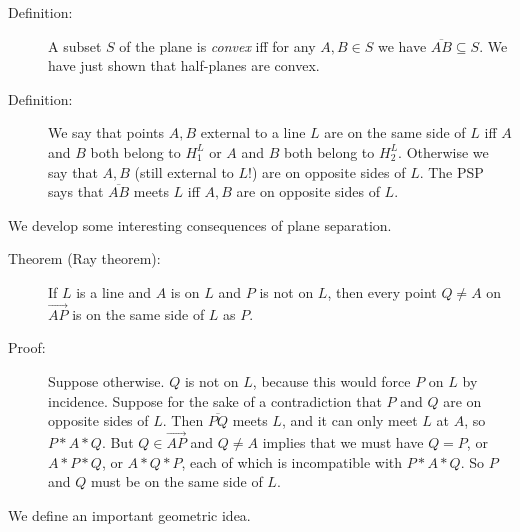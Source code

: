 \documentclass[12pt]{article}
\begin{document}
\begin{description}

\item[Definition:]  A subset $S$ of the plane is {\em convex\/} iff for any $A,B \in S$ we have $\overline{AB} \subseteq S$.  We have just shown that half-planes are convex.

\item[Definition:]  We say that points $A,B$ external to a line $L$ are on the same side of $L$ iff $A$ and $B$ both belong to $H^L_1$  or $A$ and $B$ both belong to $H^L_2$.
Otherwise we say that $A,B$ (still external to $L$!) are on opposite sides of $L$.  The PSP says that $\overline{AB}$ meets $L$ iff $A,B$ are on opposite sides of $L$.

\end{description}

We develop some interesting consequences of plane separation.

\begin{description}

\item[Theorem (Ray theorem):]  If $L$ is a line and $A$ is on $L$ and $P$ is not on $L$, then every point $Q \neq A$ on $\overrightarrow{AP}$ is on the same side of $L$ as $P$.

\item[Proof:]  Suppose otherwise.  $Q$ is not on $L$, because this would force $P$ on $L$ by incidence.  Suppose for the sake of a contradiction that $P$ and $Q$ are on opposite sides of $L$.  Then $\overline{PQ}$ meets $L$, and it can only meet $L$ at $A$, so $P*A*Q$.  But $Q \in \overrightarrow{AP}$ and $Q \neq A$ implies that we must have
$Q=P$, or $A*P*Q$, or $A*Q*P$, each of which is incompatible with $P*A*Q$.  So $P$ and $Q$ must be on the same side of $L$.

\end{description}

We define an important geometric idea.
\end{document}
